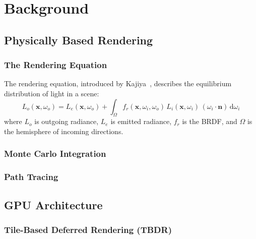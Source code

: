 \chapter{Background}
\label{chap:background}

\section{Physically Based Rendering}

\subsection{The Rendering Equation}

The rendering equation, introduced by Kajiya~\cite{Kajiya1986}, describes
the equilibrium distribution of light in a scene:
\begin{equation}
  L_o(\mathbf{x}, \omega_o) =
    L_e(\mathbf{x}, \omega_o) +
    \int_{\Omega}
      f_r(\mathbf{x}, \omega_i, \omega_o)\,
      L_i(\mathbf{x}, \omega_i)\,
      (\omega_i \cdot \mathbf{n})\,
    \mathrm{d}\omega_i
  \label{eq:rendering}
\end{equation}
where $L_o$ is outgoing radiance, $L_e$ is emitted radiance,
$f_r$ is the BRDF, and $\Omega$ is the hemisphere of incoming directions.

\subsection{Monte Carlo Integration}


\subsection{Path Tracing}


\section{GPU Architecture}

\subsection{Tile-Based Deferred Rendering (TBDR)}


